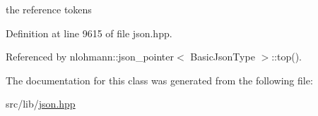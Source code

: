 the reference tokens 



Definition at line 9615 of file json.\+hpp.



Referenced by nlohmann\+::json\+\_\+pointer$<$ Basic\+Json\+Type $>$\+::top().



The documentation for this class was generated from the following file\+:\begin{DoxyCompactItemize}
\item 
src/lib/\hyperlink{json_8hpp}{json.\+hpp}\end{DoxyCompactItemize}
